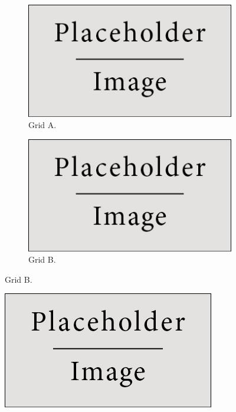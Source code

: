 \documentclass[final]{beamer}
\newlength{\threecolwid}
\begin{document}
\begin{frame}[t]
\begin{columns}[t]
\begin{column}{\threecolwid}
      \begin{minipage}[b][0.3\textheight][c]{0.4\textwidth}
        \begin{figure}[ht]
          \begin{subfigure}[t]{\textwidth}
            \centering
            \includegraphics[width=\linewidth]{figure/placeholder.jpg}
            \caption{Grid A.}
          \end{subfigure}
          \begin{subfigure}[t]{\textwidth}
            \centering
            \includegraphics[width=\linewidth]{figure/placeholder.jpg}
            \caption{Grid B.}
          \end{subfigure}
        \end{figure}
      \end{minipage}
      \begin{minipage}[b][0.3\textheight][c]{0.4\textwidth}
        \begin{figure}
          \includegraphics[width=\linewidth]{figure/placeholder.jpg}

\end{figure}
\end{minipage}
\end{column}
\end{columns}
\end{frame}
\end{document}
